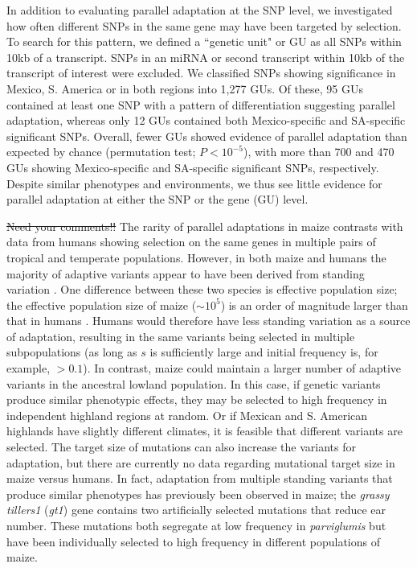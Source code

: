 {{In addition to evaluating parallel adaptation at the SNP level, we investigated how often different SNPs in the same gene may have been targeted by selection. To search for this pattern, we defined a ``genetic unit" or GU as all SNPs within 10kb of a transcript.  SNPs in an miRNA or second transcript within 10kb of the transcript of interest were excluded.  
We classified SNPs showing significance in Mexico, S. America or in both regions into 1,277 GUs. 
Of these, 95 GUs contained at least one SNP with a pattern of differentiation suggesting parallel adaptation, whereas only 12 GUs contained both Mexico-specific and SA-specific significant SNPs. 
Overall, fewer GUs showed evidence of parallel adaptation than expected by chance (permutation test; $P<10^{-5}$), with more than 700 and 470 GUs showing Mexico-specific and SA-specific significant SNPs, respectively.  
Despite similar phenotypes and environments, we thus see little evidence for parallel adaptation at either the SNP or the gene (GU) level.  

\st{Need your comments!!}
The rarity of parallel adaptations in maize contrasts with data from humans \citep{Tennessen_2011_21698142} showing selection on the same genes in multiple pairs of tropical and temperate populations.  
However, in both maize and humans the majority of adaptive variants appear to have been derived from standing variation \cite[]{Tennessen_2011_21698142}.
One difference between these two species is effective population size;
the effective population size of maize ($\sim10^5$) is an order of magnitude larger than that in humans \cite[]{Takahata_1997_9114074}.
Humans would therefore have less standing variation as a source of adaptation, resulting in the same variants being selected in multiple subpopulations (as long as $s$ is sufficiently large and initial frequency is, for example, $>0.1$).
In contrast, maize could maintain a larger number of adaptive variants in the ancestral lowland population.
In this case, if genetic variants produce similar phenotypic effects, they may be selected to high frequency in independent highland regions at random.
Or if Mexican and S. American highlands have slightly different climates, it is feasible that different variants are selected.
The target size of mutations can also increase the variants for adaptation, but there are currently no data regarding mutational target size in maize versus humans.
In fact, adaptation from multiple standing variants that produce similar phenotypes has previously been observed in maize; %
the \emph{grassy tillers1} (\emph{gt1}) gene \cite[]{Wills_2013_23825971} contains two artificially selected mutations that reduce ear number.
These mutations both segregate at low frequency in \emph{parviglumis} but have been individually selected to high frequency in different populations of maize.

}}
